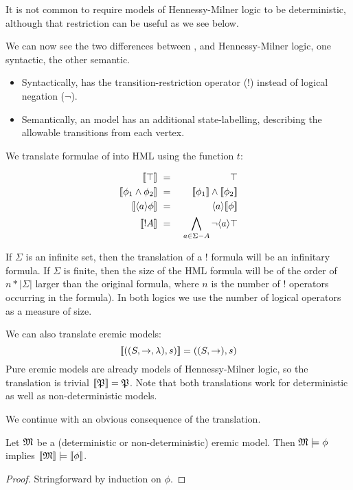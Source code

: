 \NI It is not common to require models of Hennessy-Milner logic to be
deterministic, although that restriction can be useful as we see
below.

We can now see the two differences between \ELFULL{}, and
Hennessy-Milner logic, one syntactic, the other semantic.

\begin{itemize}

\item Syntactically, \ELABR{} has the transition-restriction operator ($!$)
  instead of logical negation ($\neg$).

\item Semantically, an \ELABR{} model has an additional state-labelling,
  describing the allowable transitions from each vertex.

\end{itemize}

\NI We translate formulae of \ELABR{} into HML using the function
$t$:

\begin{eqnarray*}
  \SEMB{\top} & \ = \ & \top  \\
  \SEMB{\phi_1 \AND \phi_2} & \ = \ & \SEMB{\phi_1} \AND \SEMB{\phi_2}  \\
  \SEMB{\langle a \rangle \phi} & \ = \ & \langle a \rangle \SEMB{\phi}  \\
  \SEMB{! A} & \ = \ & \bigwedge_{a \in \Sigma - A} \neg \langle a \rangle \top 
\end{eqnarray*}

\NI If $\Sigma$ is an infinite set, then the translation of a $!$
formula will be an infinitary formula.  If $\Sigma$ is finite, then
the size of the HML formula will be of the order of $n * | \Sigma |$
larger than the original \ELABR{} formula, where $n$ is the number of
$!$ operators occurring in the \ELABR{} formula). In both logics we
use the number of logical operators as a measure of size.

We can also translate eremic models:
\[
   \lbrack\!\lbrack ((S, \rightarrow, \lambda), s) \rbrack\!\rbrack 
      =
   ((S, \rightarrow), s)
\]
Pure eremic models are already models of Hennessy-Milner logic, so the
translation is trivial $\lbrack\!\lbrack \frak{P} \rbrack\!\rbrack = \frak{P}$. Note that both
translations work for deterministic as well as non-deterministic
models.

We continue with an obvious consequence of the translation.

\begin{theorem}
Let $\frak{M}$ be a (deterministic or non-deterministic) eremic
  model. Then $\frak{M} \models \phi$ implies $\lbrack\!\lbrack \frak{M} \rbrack\!\rbrack \models
  \lbrack\!\lbrack \phi \rbrack\!\rbrack$.
\end{theorem}
\begin{proof}
Stringforward by induction on $\phi$.
\end{proof}

